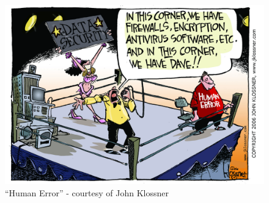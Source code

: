 \TODO

\begin{figure}[ht]
  \centering
  \includegraphics[width=\linewidth]{resources/cartoon_human_error.jpg}
  \caption[``Human Error'']{``Human Error'' - courtesy of John Klossner}
\end{figure}





